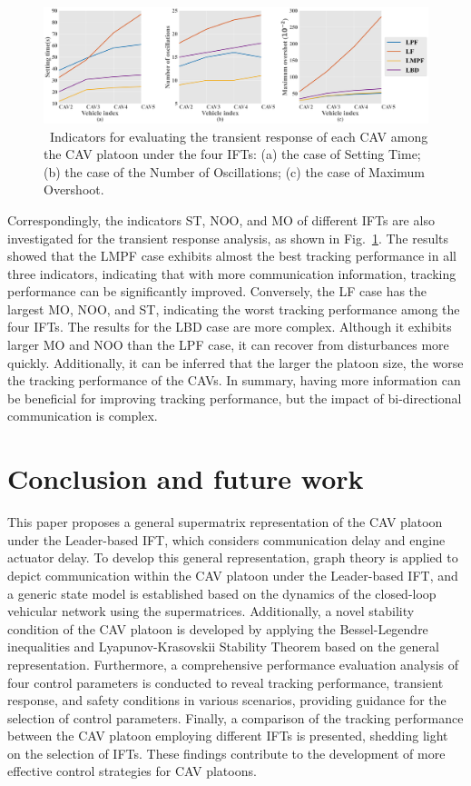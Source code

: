 \documentclass[a4paper]{cas-sc}
\begin{document}
\begin{figure}

  \centering
  \includegraphics[width=14cm]{figs/fig10.png}
  \caption{~Indicators for evaluating the transient response of each CAV among the CAV platoon under the four IFTs: (a) the case of Setting Time; (b) the case of the Number of Oscillations; (c) the case of Maximum Overshoot.}
  \label{fig10}
\end{figure}

Correspondingly, the indicators ST, NOO, and MO of different IFTs are also investigated for the transient response analysis, as shown in Fig.~\ref{fig10}. The results showed that the LMPF case exhibits almost the best tracking performance in all three indicators, indicating that with more communication information, tracking performance can be significantly improved. Conversely, the LF case has the largest MO, NOO, and ST, indicating the worst tracking performance among the four IFTs. The results for the LBD case are more complex. Although it exhibits larger MO and NOO than the LPF case, it can recover from disturbances more quickly. Additionally, it can be inferred that the larger the platoon size, the worse the tracking performance of the CAVs. In summary, having more information can be beneficial for improving tracking performance, but the impact of bi-directional communication is complex.






\section{Conclusion and future work}
\label{Section 6}

This paper proposes a general supermatrix representation of the CAV platoon under the Leader-based IFT, which considers communication delay and engine actuator delay. To develop this general representation, graph theory is applied to depict communication within the CAV platoon under the Leader-based IFT, and a generic state model is established based on the dynamics of the closed-loop vehicular network using the supermatrices. Additionally, a novel stability condition of the CAV platoon is developed by applying the Bessel-Legendre inequalities and Lyapunov-Krasovskii Stability Theorem based on the general representation. Furthermore, a comprehensive performance evaluation analysis of four control parameters is conducted to reveal tracking performance, transient response, and safety conditions in various scenarios, providing guidance for the selection of control parameters. Finally, a comparison of the tracking performance between the CAV platoon employing different IFTs is presented, shedding light on the selection of IFTs. These findings contribute to the development of more effective control strategies for CAV platoons.
\end{document}
